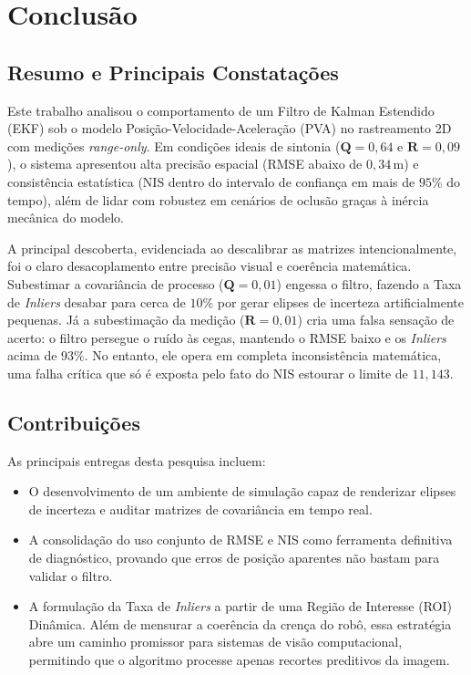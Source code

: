 
\section{Conclusão}
\label{sec:conclusion}

\subsection{Resumo e Principais Constatações}
\label{subsec:summary_findings}

Este trabalho analisou o comportamento de um Filtro de Kalman Estendido (EKF) sob o modelo Posição-Velocidade-Aceleração (PVA) no rastreamento 2D com medições \textit{range-only}. Em condições ideais de sintonia ($\mathbf{Q}=0{,}64$ e $\mathbf{R}=0{,}09$), o sistema apresentou alta precisão espacial (RMSE abaixo de $0{,}34$\,m) e consistência estatística (NIS dentro do intervalo de confiança em mais de $95\%$ do tempo), além de lidar com robustez em cenários de oclusão graças à inércia mecânica do modelo.

A principal descoberta, evidenciada ao descalibrar as matrizes intencionalmente, foi o claro desacoplamento entre precisão visual e coerência matemática. Subestimar a covariância de processo ($\mathbf{Q}=0{,}01$) engessa o filtro, fazendo a Taxa de \textit{Inliers} desabar para cerca de $10\%$ por gerar elipses de incerteza artificialmente pequenas. Já a subestimação da medição ($\mathbf{R}=0{,}01$) cria uma falsa sensação de acerto: o filtro persegue o ruído às cegas, mantendo o RMSE baixo e os \textit{Inliers} acima de $93\%$. No entanto, ele opera em completa inconsistência matemática, uma falha crítica que só é exposta pelo fato do NIS estourar o limite de $11{,}143$.

\subsection{Contribuições}
\label{subsec:contributions}

As principais entregas desta pesquisa incluem:
\begin{itemize}
    \item O desenvolvimento de um ambiente de simulação capaz de renderizar elipses de incerteza e auditar matrizes de covariância em tempo real.
    \item A consolidação do uso conjunto de RMSE e NIS como ferramenta definitiva de diagnóstico, provando que erros de posição aparentes não bastam para validar o filtro.
    \item A formulação da Taxa de \textit{Inliers} a partir de uma Região de Interesse (ROI) Dinâmica. Além de mensurar a coerência da crença do robô, essa estratégia abre um caminho promissor para sistemas de visão computacional, permitindo que o algoritmo processe apenas recortes preditivos da imagem.
\end{itemize}

